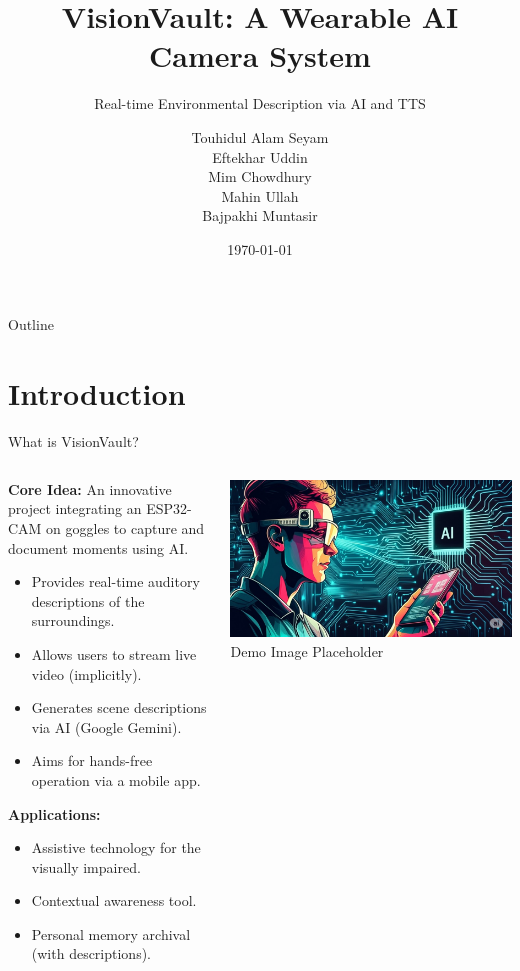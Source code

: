 \documentclass{beamer}
\title{VisionVault: A Wearable AI Camera System}
\subtitle{Real-time Environmental Description via AI and TTS}
\author{
    Touhidul Alam Seyam \\ 
    Eftekhar Uddin \\ 
    Mim Chowdhury \\ 
    Mahin Ullah \\ 
    Bajpakhi Muntasir
}
\date{\today}
\institute{
    Microprocessor Lab \\ 
    Professor Radiathun Tasnia, Junior Lecturer
}
\begin{document}
\begin{frame}
  \titlepage
\end{frame}

\begin{frame}{Outline}
  \tableofcontents
\end{frame}

\section{Introduction}

\begin{frame}{What is VisionVault?}
  \begin{columns}[T] %
    \begin{column}{0.6\textwidth}
      \textbf{Core Idea:} An innovative project integrating an ESP32-CAM on goggles to capture and document moments using AI.
      \vspace{1em}
      \begin{itemize}
        \item Provides real-time auditory descriptions of the surroundings.
        \item Allows users to stream live video (implicitly).
        \item Generates scene descriptions via AI (Google Gemini).
        \item Aims for hands-free operation via a mobile app.
      \end{itemize}
       \vspace{1em}
       \textbf{Applications:}
       \begin{itemize}
        \item Assistive technology for the visually impaired.
        \item Contextual awareness tool.
        \item Personal memory archival (with descriptions).
      \end{itemize}
    \end{column}
    \begin{column}{0.4\textwidth}
      \centering
      \includegraphics[width=\linewidth]{"vision vault.jpeg"} \\ %
      \tiny Demo Image Placeholder
    \end{column}
  \end{columns}
\end{frame}
\end{document}
